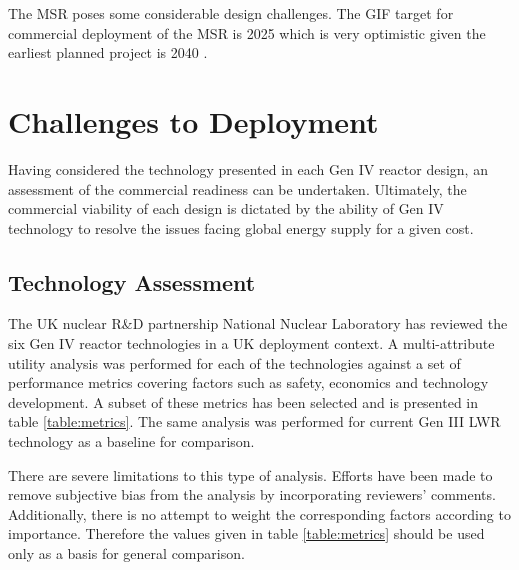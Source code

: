 \documentclass[journal]{IEEEtran}
\begin{document}
The MSR poses some considerable design challenges.
The GIF target for commercial deployment of the MSR is 2025 \cite{GenIVRoadmap} which is very optimistic given the earliest planned project is 2040 \cite{Locatelli2013}.


\section{Challenges to Deployment}
%

Having considered the technology presented in each Gen IV reactor design, an assessment of the commercial readiness can be undertaken.
Ultimately, the commercial viability of each design is dictated by the ability of Gen IV technology to resolve the issues facing global energy supply for a given cost.

\subsection{Technology Assessment}
The UK nuclear R\&D partnership National Nuclear Laboratory has reviewed the six Gen IV reactor technologies in a UK deployment context.
A multi-attribute utility analysis was performed for each of the technologies against a set of performance metrics covering factors such as safety, economics and technology development.
A subset of these metrics has been selected and is presented in table \ref{table:metrics}.
The same analysis was performed for current Gen III LWR technology as a baseline for comparison.

There are severe limitations to this type of analysis.
Efforts have been made to remove subjective bias from the analysis by incorporating reviewers' comments.
Additionally, there is no attempt to weight the corresponding factors according to importance.
Therefore the values given in table \ref{table:metrics} should be used only as a basis for general comparison.
\end{document}
